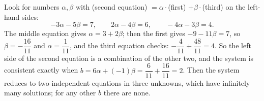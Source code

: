 Look for numbers $\alpha,\beta$ with (second equation) $=\alpha\cdot$(first) $+\beta\cdot$(third) on the left-hand sides:
\[-3\alpha-5\beta=7,\qquad 2\alpha-4\beta=6,\qquad -4\alpha-3\beta=4.\]
The middle equation gives $\alpha=3+2\beta$; then the first gives $-9-11\beta=7$, so $\beta=-\dfrac{16}{11}$ and $\alpha=\dfrac{1}{11}$, and the third equation checks: $-\dfrac{4}{11}+\dfrac{48}{11}=4$. So the left side of the second equation is a combination of the other two, and the system is consistent exactly when $b=6\alpha+(-1)\beta=\dfrac{6}{11}+\dfrac{16}{11}=\boxed{2}$. Then the system reduces to two independent equations in three unknowns, which have infinitely many solutions; for any other $b$ there are none.
